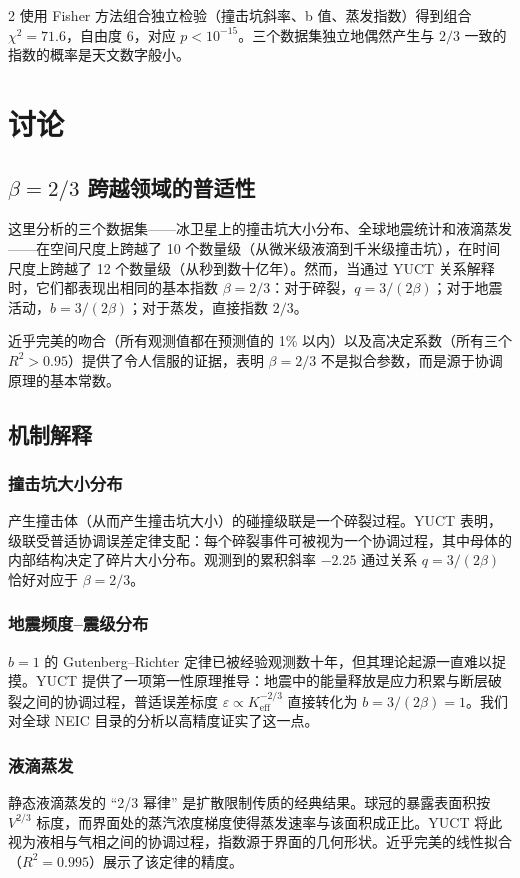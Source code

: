 \documentclass[11pt,a4paper]{article}
\newcommand{\eps}{\varepsilon}
\newcommand{\Keff}{K_{\mathrm{eff}}}
\newcommand{\betaf}{\beta}
\begin{document}
\begin{multicols}{2}
		使用 Fisher 方法组合独立检验（撞击坑斜率、b 值、蒸发指数）得到组合 \(\chi^2 = 71.6\)，自由度 6，对应 \(p < 10^{-15}\)。三个数据集独立地偶然产生与 \(2/3\) 一致的指数的概率是天文数字般小。
		
		\section{讨论}
		
		\subsection{\(\betaf = 2/3\) 跨越领域的普适性}
		
		这里分析的三个数据集——冰卫星上的撞击坑大小分布、全球地震统计和液滴蒸发——在空间尺度上跨越了 10 个数量级（从微米级液滴到千米级撞击坑），在时间尺度上跨越了 12 个数量级（从秒到数十亿年）。然而，当通过 YUCT 关系解释时，它们都表现出相同的基本指数 \(\betaf = 2/3\)：对于碎裂，\(q = 3/(2\betaf)\)；对于地震活动，\(b = 3/(2\betaf)\)；对于蒸发，直接指数 \(2/3\)。
		
		近乎完美的吻合（所有观测值都在预测值的 1\% 以内）以及高决定系数（所有三个 \(R^2 > 0.95\)）提供了令人信服的证据，表明 \(\betaf = 2/3\) 不是拟合参数，而是源于协调原理的基本常数。
		
		\subsection{机制解释}
		
		\subsubsection{撞击坑大小分布}
		产生撞击体（从而产生撞击坑大小）的碰撞级联是一个碎裂过程。YUCT 表明，级联受普适协调误差定律支配：每个碎裂事件可被视为一个协调过程，其中母体的内部结构决定了碎片大小分布。观测到的累积斜率 \(-2.25\) 通过关系 \(q = 3/(2\betaf)\) 恰好对应于 \(\betaf = 2/3\)。
		
		\subsubsection{地震频度–震级分布}
		\(b = 1\) 的 Gutenberg–Richter 定律已被经验观测数十年，但其理论起源一直难以捉摸。YUCT 提供了一项第一性原理推导：地震中的能量释放是应力积累与断层破裂之间的协调过程，普适误差标度 \(\eps \propto \Keff^{-2/3}\) 直接转化为 \(b = 3/(2\betaf) = 1\)。我们对全球 NEIC 目录的分析以高精度证实了这一点。
		
		\subsubsection{液滴蒸发}
		静态液滴蒸发的 “2/3 幂律” 是扩散限制传质的经典结果。球冠的暴露表面积按 \(V^{2/3}\) 标度，而界面处的蒸汽浓度梯度使得蒸发速率与该面积成正比。YUCT 将此视为液相与气相之间的协调过程，指数源于界面的几何形状。近乎完美的线性拟合（\(R^2 = 0.995\)）展示了该定律的精度。
		

\end{multicols}
\end{document}
